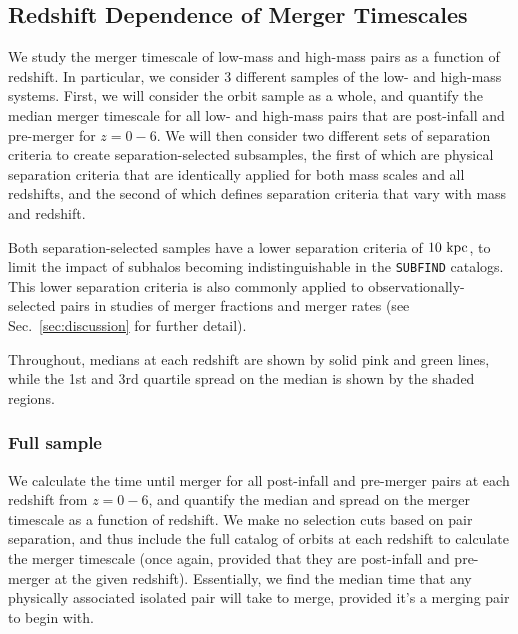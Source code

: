 \documentclass[twocolumn,linenumbers]{aastex631}
\begin{document}
\subsection{Redshift Dependence of Merger Timescales}\label{sec:results-timevredshift}
We study the merger timescale of low-mass and high-mass pairs as a function of redshift. 
In particular, we consider 3 different samples of the low- and high-mass systems. 
First, we will consider the orbit sample as a whole, and quantify the median merger timescale for all low- and high-mass pairs that are post-infall and pre-merger for $z=0-6$. 
We will then consider two different sets of separation criteria to create separation-selected subsamples, the first of which are physical separation criteria that are identically applied for both mass scales and all redshifts, and the second of which defines separation criteria that vary with mass and redshift.

Both separation-selected samples have a lower separation criteria of $10\,\mathrm{\,kpc}$, to limit the impact of subhalos becoming indistinguishable in the \texttt{SUBFIND} catalogs.
This lower separation criteria is also commonly applied to observationally-selected pairs in studies of merger fractions and merger rates (see Sec.~\ref{sec:discussion} for further detail).

Throughout, medians at each redshift are shown by solid pink and green lines, while the 1st and 3rd quartile spread on the median is shown by the shaded regions. 

\subsubsection{Full sample}
We calculate the time until merger for all post-infall and pre-merger pairs at each redshift from $z=0-6$, and quantify the median and spread on the merger timescale as a function of redshift. 
We make no selection cuts based on pair separation, and thus include the full catalog of orbits at each redshift to calculate the merger timescale (once again, provided that they are post-infall and pre-merger at the given redshift). 
Essentially, we find the median time that any physically associated isolated pair will take to merge, provided it's a merging pair to begin with. 
\end{document}

